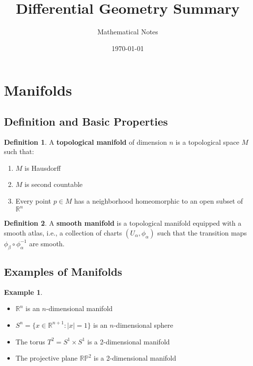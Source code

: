 \documentclass[11pt]{article}
\title{Differential Geometry Summary}
\author{Mathematical Notes}
\date{\today}
\theoremstyle{definition}
\newtheorem{definition}{Definition}[section]
\newtheorem{example}{Example}[section]
\begin{document}
\maketitle

\tableofcontents
\newpage

\section{Manifolds}

\subsection{Definition and Basic Properties}
\begin{definition}
A \textbf{topological manifold} of dimension $n$ is a topological space $M$ such that:
\begin{enumerate}
    \item $M$ is Hausdorff
    \item $M$ is second countable
    \item Every point $p \in M$ has a neighborhood homeomorphic to an open subset of $\mathbb{R}^n$
\end{enumerate}
\end{definition}

\begin{definition}
A \textbf{smooth manifold} is a topological manifold equipped with a smooth atlas, i.e., a collection of charts $(U_\alpha, \phi_\alpha)$ such that the transition maps $\phi_\beta \circ \phi_\alpha^{-1}$ are smooth.
\end{definition}

\subsection{Examples of Manifolds}
\begin{example}
\begin{itemize}
    \item $\mathbb{R}^n$ is an $n$-dimensional manifold
    \item $S^n = \{x \in \mathbb{R}^{n+1} : |x| = 1\}$ is an $n$-dimensional sphere
    \item The torus $T^2 = S^1 \times S^1$ is a 2-dimensional manifold
    \item The projective plane $\mathbb{RP}^2$ is a 2-dimensional manifold
\end{itemize}
\end{example}
\end{document}
